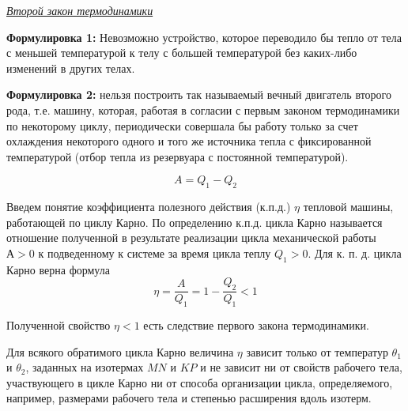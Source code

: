 \begin{center}
	\textit{\underline{Второй закон термодинамики}}
\end{center}

\textbf{Формулировка 1:} Невозможно устройство, которое переводило бы тепло от тела с меньшей температурой к телу с большей температурой без каких-либо изменений в других телах.

\textbf{Формулировка 2:} нельзя построить так называемый вечный двигатель второго рода, т.е. машину,  которая,  работая в согласии с первым законом термодинамики по некоторому циклу,  периодически совершала бы работу только за счет охлаждения некоторого одного и того же источника тепла с фиксированной температурой (отбор тепла из резервуара с постоянной температурой).

$$ A = Q_1 - Q_2 $$

Введем понятие коэффициента полезного действия (к.п.д.) $\eta$ тепловой машины, работающей по циклу Карно. По определению к.п.д.  цикла Карно называется отношение полученной в результате реализации цикла механической работы $А > 0$ к подведенному к системе за время цикла теплу $Q_1 > 0$.  Для к. п. д. цикла Карно верна формула
$$ \eta = \frac{A}{Q_1} = 1 - \frac{Q_2}{Q_1} < 1 $$

Полученной свойство $\eta < 1$ есть следствие первого закона термодинамики. 

\begin{state}
	Для всякого обратимого цикла Карно величина $\eta$ зависит только от температур $\theta_1$ и $\theta_2$,  заданных на изотермах $MN$ и $KP$ и не зависит ни от свойств рабочего тела, участвующего в цикле Карно ни от способа организации цикла, определяемого, например, размерами рабочего тела и степенью расширения вдоль изотерм.
\end{state}

